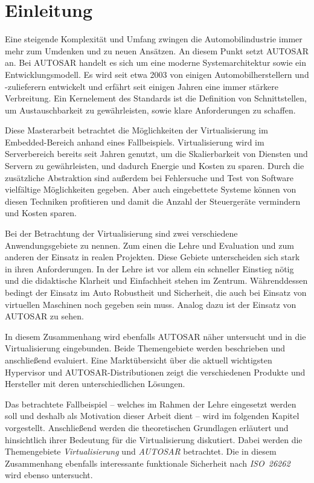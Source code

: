 \documentclass[
  a4paper,					    %
  twoside,
  DIV=calc,     				%
  bibliography=totoc,
  cleardoublepage=empty,
  ngerman,     					%
  final       					%
]{scrbook}
\begin{document}
\mainmatter
\chapter{Einleitung}
\label{sec:Einleitung}
Eine steigende Komplexität und Umfang zwingen die Automobilindustrie immer mehr zum Umdenken und zu neuen Ansätzen. An diesem Punkt setzt AUTOSAR an. Bei AUTOSAR handelt es sich um eine moderne Systemarchitektur sowie ein Entwicklungsmodell. Es wird seit etwa 2003 von einigen Automobilherstellern und -zulieferern entwickelt und erfährt seit einigen Jahren eine immer stärkere Verbreitung. Ein Kernelement des Standards ist die Definition von Schnittstellen, um Austauschbarkeit zu gewährleisten, sowie klare Anforderungen zu schaffen.

Diese Masterarbeit betrachtet die Möglichkeiten der Virtualisierung im Em\-bed\-ded-Be\-reich anhand eines Fallbeispiels. Virtualisierung wird im Serverbereich bereits seit Jahren genutzt, um die Skalierbarkeit von Diensten und Servern zu gewährleisten, und dadurch Energie und Kosten zu sparen. Durch die zusätzliche Abstraktion sind außerdem bei Fehlersuche und Test von Software vielfältige Möglichkeiten gegeben. Aber auch eingebettete Systeme können von diesen Techniken profitieren und damit die Anzahl der Steuergeräte vermindern und Kosten sparen.

Bei der Betrachtung der Virtualisierung sind zwei verschiedene Anwendungsgebiete zu nennen. Zum einen die Lehre und Evaluation und zum anderen der Einsatz in realen Projekten. Diese Gebiete unterscheiden sich stark in ihren Anforderungen. In der Lehre ist vor allem ein schneller Einstieg nötig und die didaktische Klarheit und Einfachheit stehen im Zentrum. Währenddessen bedingt der Einsatz im Auto Robustheit und Sicherheit, die auch bei Einsatz von virtuellen Maschinen noch gegeben sein muss. Analog dazu ist der Einsatz von AUTOSAR zu sehen.

In diesem Zusammenhang wird ebenfalls AUTOSAR näher untersucht und in die Virtualisierung eingebunden. Beide Themengebiete werden beschrieben und anschließend evaluiert. Eine Marktübersicht über die aktuell wichtigsten Hypervisor und AUTOSAR-Distributionen zeigt die verschiedenen Produkte und Hersteller mit deren unterschiedlichen Lösungen.

Das betrachtete Fallbeispiel -- welches im Rahmen der Lehre eingesetzt werden soll und deshalb als Motivation dieser Arbeit dient -- wird im folgenden Kapitel vorgestellt. Anschließend werden die theoretischen Grundlagen erläutert und hinsichtlich ihrer Bedeutung für die Virtualisierung diskutiert. Dabei werden die Themengebiete \emph{Virtualisierung} und \emph{AUTOSAR} betrachtet. Die in diesem Zusammenhang ebenfalls interessante funktionale Sicherheit nach \mbox{\emph{ISO 26262}} wird ebenso untersucht.
\end{document}
